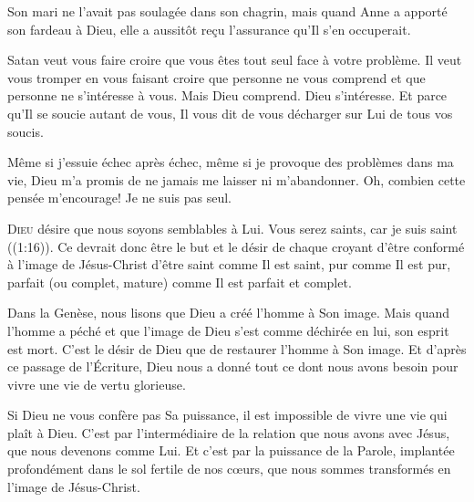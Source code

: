 
Son mari ne l'avait pas soulagée dans son chagrin,
 mais quand Anne a apporté son fardeau à Dieu,
 elle a aussitôt reçu l'assurance qu'Il s'en occuperait.

Satan veut vous faire croire que vous êtes tout seul face à votre problème.
 Il veut vous tromper en vous faisant croire que personne ne vous comprend
 et que personne ne s'intéresse à vous. Mais Dieu comprend. Dieu s'intéresse.
 Et parce qu'Il se soucie autant de vous, Il vous dit de vous décharger
 sur Lui de tous vos soucis.

Même si j'essuie échec après échec, même si je provoque des problèmes
 dans ma vie, Dieu m'a promis de ne jamais me laisser ni m'abandonner.
 Oh, combien cette pensée m'encourage! Je ne suis pas seul.

\dvrule






\lettrine{D}{ieu} désire que nous soyons semblables à Lui.
 \og Vous serez saints, car je suis saint \fg{} ((1:16)).
 Ce devrait donc être le but et le désir de chaque croyant d'être conformé
 à l'image de Jésus-Christ \ocadr d'être saint comme Il est saint,
 pur comme Il est pur, parfait (ou complet, mature)
 comme Il est parfait et complet.

Dans la Genèse, nous lisons que Dieu a créé l'homme à Son image.
 Mais quand l'homme a péché et que l'image de Dieu s'est comme déchirée en lui,
 son esprit est mort. C'est le désir de Dieu que de restaurer l'homme
 à Son image. Et d'après ce passage de l'Écriture,
 Dieu nous a donné tout ce dont nous avons besoin
 pour vivre une vie de vertu glorieuse.


Si Dieu ne vous confère pas Sa puissance, il est impossible de vivre une vie
 qui plaît à Dieu. C'est par l'intermédiaire de la relation que nous avons
 avec Jésus, que 
 nous devenons comme Lui. Et c'est par la puissance de la Parole,
 implantée profondément dans le sol fertile de nos c\oe{}urs,
 que nous sommes transformés en l'image de Jésus-Christ.

